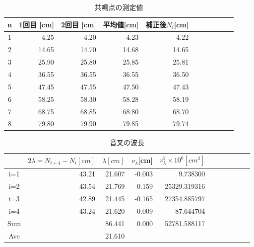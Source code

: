 \documentclass[a4paper,1pt]{jsarticle}
\begin{document}
\begin{table}[H]
  \caption{共鳴点の測定値}
  \label{table:SpeedOfLight}
  \centering
  \begin{tabular}{|c||r|r|r|r|r|r|r|r|r|r|}
    \hline
    n & 1回目 [cm]& 2回目 [cm]& 平均値[cm] & 補正後$N_i$[cm] \\
    \hline\hline
    
    1 & 4.25 & 4.20 & 4.23 & 4.22 \\
    2 & 14.65 & 14.70 & 14.68 & 14.65 \\
    3 & 25.90 & 25.80 & 25.85 & 25.81 \\
    4 & 36.55 & 36.55 & 36.55 & 36.50 \\
    5 & 47.45 & 47.55 & 47.50 & 47.43 \\
    6 & 58.25 & 58.30 & 58.28 & 58.19 \\
    7 & 68.75 & 68.85 & 68.80 & 68.70 \\
    8 & 79.80 & 79.90 & 79.85 & 79.74 \\
    
    

    \hline
  \end{tabular}


\end{table}

\begin{table}[H]
  \caption{音叉の波長}
  \label{table:SpeedOfLight}
  \centering
  \begin{tabular}{|c||r|r|r|r|r|r|r|r|r|r|}
    \hline
    & $2\lambda =N_{i+4}-N_{i} [cm]$ & $\lambda [cm]$ & $v_\lambda $[cm]&  $v_\lambda ^2\times 10^6[cm^2]$\\
    \hline\hline
    
   
    i=1 & 43.21 &21.607& -0.003 & 9.738300 \\
    i=2 & 43.54 &21.769& 0.159 & 25329.319316 \\
    i=3 & 42.89 &21.445& -0.165 & 27354.885797 \\
    i=4 & 43.24 &21.620& 0.009 & 87.644704 \\
    
    
   
    
    

    \hline\hline

    Sum & & 86.441 & 0.000 & 52781.588117 \\
    \hline
    Ave & & 21.610 &  &  \\
    \hline
  \end{tabular}


\end{table}
\end{document}
